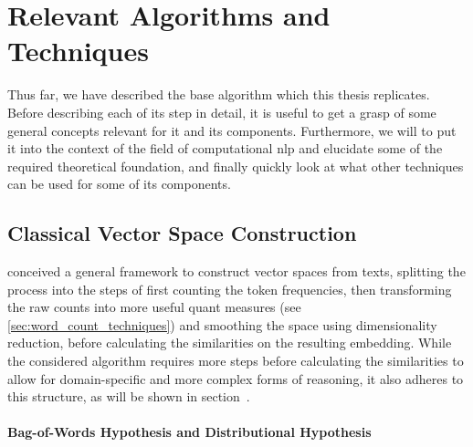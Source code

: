 \section{Relevant Algorithms and Techniques}
\label{sec:required_algos}


Thus far, we have described the base algorithm which this thesis replicates. Before describing each of its step in detail, it is useful to get a grasp of some general concepts relevant for it and its components. Furthermore, we will to put it into the context of the field of computational \gls{nlp} and elucidate some of the required theoretical foundation, and finally quickly look at what other techniques can be used for some of its components. 

\subsection{Classical Vector Space Construction}
\label{sec:vsm_construction}



\textcite{Lowe} conceived a general framework to construct vector spaces from texts, splitting the process into the steps of first counting the token frequencies, then transforming the raw counts into more useful \gls{quant} measures (see \ref{sec:word_count_techniques}) %
and smoothing the space using dimensionality reduction, before calculating the similarities on the resulting embedding. While the considered algorithm requires more steps before calculating the similarities to allow for domain-specific and more complex forms of reasoning, it also adheres to this structure, as will be shown in section~.

\paragraph{Bag-of-Words Hypothesis and Distributional Hypothesis}
\label{sec:bow_hypothesis}

